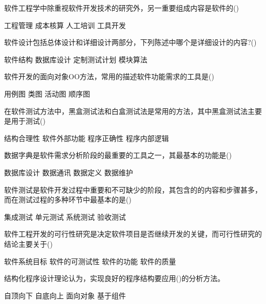 \documentclass[answer]{exam}
\begin{document}
\begin{questions}
	\question 软件工程学中除重视软件开发技术的研究外，另一重要组成内容是软件的()\\
	\begin{oneparchoices}
		\choice 工程管理
		\choice 成本核算
		\choice 人工培训
		\choice 工具开发
	\end{oneparchoices}
	\question 软件设计包括总体设计和详细设计两部分，下列陈述中哪个是详细设计的内容?()\\
	\begin{oneparchoices}
		\choice 软件结构
		\choice 数据库设计
		\choice 定制测试计划
		\choice 模块算法
	\end{oneparchoices}
	\question 软件开发的面向对象OO方法，常用的描述软件功能需求的工具是()\\
	\begin{oneparchoices}
		\choice 用例图
		\choice 类图
		\choice 活动图
		\choice 顺序图
	\end{oneparchoices}
	\question 在软件测试方法中，黑盒测试法和白盒测试法是常用的方法，其中黑盒测试法主要是用于测试()\\
	\begin{oneparchoices}
		\choice 结构合理性
		\choice 软件外部功能
		\choice 程序正确性
		\choice 程序内部逻辑
	\end{oneparchoices}
	\question 数据字典是软件需求分析阶段的最重要的工具之一，其最基本的功能是()\\
	\begin{oneparchoices}
		\choice 数据库设计
		\choice 数据通讯
		\choice 数据定义
		\choice 数据维护
	\end{oneparchoices}
	\question 软件测试是软件开发过程中重要和不可缺少的阶段，其包含的的内容和步骤甚多，而在测试过程的多种环节中最基本的是()\\
	\begin{oneparchoices}
		\choice 集成测试
		\choice 单元测试
		\choice 系统测试
		\choice 验收测试
	\end{oneparchoices}
	\question 软件工程开发的可行性研究是决定软件项目是否继续开发的关键，而可行性研究的结论主要关于()\\
	\begin{oneparchoices}
		\choice 软件系统目标
		\choice 软件的可测试性
		\choice 软件的功能
		\choice 软件的质量
	\end{oneparchoices}
	\question 结构化程序设计理论认为，实现良好的程序结构要应用()的分析方法。\\
	\begin{oneparchoices}
		\choice 自顶向下
		\choice 自底向上
		\choice 面向对象
		\choice 基于组件
	\end{oneparchoices}

\end{questions}
\end{document}
